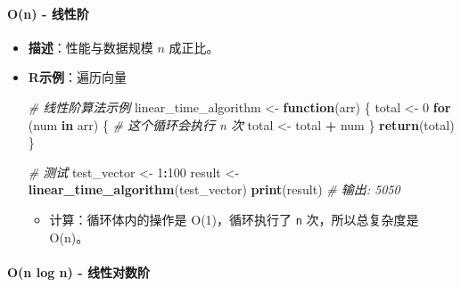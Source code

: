 \documentclass[
]{book}
\newenvironment{Shaded}{\begin{snugshade}}{\end{snugshade}}
\newcommand{\CommentTok}[1]{\textcolor[rgb]{0.56,0.35,0.01}{\textit{#1}}}
\newcommand{\ControlFlowTok}[1]{\textcolor[rgb]{0.13,0.29,0.53}{\textbf{#1}}}
\newcommand{\DecValTok}[1]{\textcolor[rgb]{0.00,0.00,0.81}{#1}}
\newcommand{\FunctionTok}[1]{\textcolor[rgb]{0.13,0.29,0.53}{\textbf{#1}}}
\newcommand{\NormalTok}[1]{#1}
\newcommand{\OtherTok}[1]{\textcolor[rgb]{0.56,0.35,0.01}{#1}}
\newcommand{\SpecialCharTok}[1]{\textcolor[rgb]{0.81,0.36,0.00}{\textbf{#1}}}
\providecommand{\tightlist}{%
  \setlength{\itemsep}{0pt}\setlength{\parskip}{0pt}}
\begin{document}
\hypertarget{on---ux7ebfux6027ux9636}{%
\paragraph{O(n) - 线性阶}\label{on---ux7ebfux6027ux9636}}

\begin{itemize}
\item
  \textbf{描述}：性能与数据规模 \(n\) 成正比。
\item
  \textbf{R示例}：遍历向量

\begin{Shaded}
\begin{Highlighting}[]
\CommentTok{\# 线性阶算法示例}
\NormalTok{linear\_time\_algorithm }\OtherTok{\textless{}{-}} \ControlFlowTok{function}\NormalTok{(arr) \{}
\NormalTok{  total }\OtherTok{\textless{}{-}} \DecValTok{0}
  \ControlFlowTok{for}\NormalTok{ (num }\ControlFlowTok{in}\NormalTok{ arr) \{  }\CommentTok{\# 这个循环会执行 n 次}
\NormalTok{    total }\OtherTok{\textless{}{-}}\NormalTok{ total }\SpecialCharTok{+}\NormalTok{ num}
\NormalTok{  \}}
  \FunctionTok{return}\NormalTok{(total)}
\NormalTok{\}}

\CommentTok{\# 测试}
\NormalTok{test\_vector }\OtherTok{\textless{}{-}} \DecValTok{1}\SpecialCharTok{:}\DecValTok{100}
\NormalTok{result }\OtherTok{\textless{}{-}} \FunctionTok{linear\_time\_algorithm}\NormalTok{(test\_vector)}
\FunctionTok{print}\NormalTok{(result)  }\CommentTok{\# 输出: 5050}
\end{Highlighting}
\end{Shaded}

  \begin{itemize}
  \tightlist
  \item
    计算：循环体内的操作是 O(1)，循环执行了 \texttt{n} 次，所以总复杂度是 O(n)。
  \end{itemize}
\end{itemize}

\hypertarget{on-log-n---ux7ebfux6027ux5bf9ux6570ux9636}{%
\paragraph{O(n log n) - 线性对数阶}\label{on-log-n---ux7ebfux6027ux5bf9ux6570ux9636}}
\end{document}
